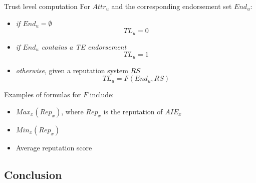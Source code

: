 \begin{frame}{Trust level computation}
For $Attr_u$ and the corresponding endorsement set $End_u$:
    \begin{itemize}
        \item \emph{if $End_u = \emptyset$} 
        $$TL_u = 0$$
        
        \item \emph{if $End_u$ contains a TE endorsement} 
        $$TL_u = 1$$
        
        \item \emph{otherwise}, given a reputation system $RS$  
        $$TL_u = F(End_u, RS)$$ 
    \end{itemize}
    
Examples of formulas for $F$ include:
    \begin{itemize}
        \item $Max_x(Rep_x)$, where $Rep_x$ is the reputation of $AIE_x$
        \item $Min_x(Rep_x)$
        \item Average reputation score
    \end{itemize}

\end{frame}

\subsection{Conclusion}

